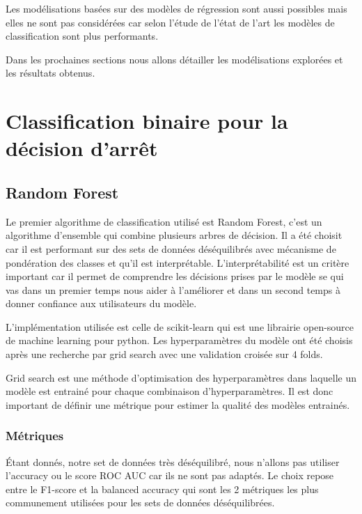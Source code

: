 Les modélisations basées sur des modèles de régression sont aussi possibles mais elles ne sont pas considérées car selon l'étude de l'état de l'art
\cite{app10217805} les modèles de classification sont plus performants.

Dans les prochaines sections nous allons détailler les modélisations explorées et les résultats obtenus.
\section{Classification binaire pour la décision d'arrêt}
\subsection{Random Forest}
Le premier algorithme de classification utilisé est Random Forest, c'est un algorithme d'ensemble qui combine plusieurs arbres de décision.
Il a été choisit car il est performant sur des sets de données déséquilibrés avec mécanisme de pondération des classes et qu'il est interprétable.
L'interprétabilité est un critère important car il permet de comprendre les décisions prises par le modèle se qui vas dans un premier temps nous aider à l'améliorer
et dans un second temps à donner confiance aux utilisateurs du modèle.

L'implémentation utilisée est celle de scikit-learn \cite{scikitLearnRandomForest} qui est une librairie open-source de machine learning pour python.
Les hyperparamètres du modèle ont été choisis après une recherche par grid search avec une validation croisée sur 4 folds.

Grid search est une méthode d'optimisation des hyperparamètres dans laquelle un modèle est entrainé pour chaque combinaison d'hyperparamètres.
Il est donc important de définir une métrique pour estimer la qualité des modèles entrainés.
\subsubsection{Métriques}
Étant donnés, notre set de données très déséquilibré, nous n'allons pas utiliser l'accuracy ou le score ROC AUC car ils ne sont pas adaptés.
Le choix repose entre le F1-score et la balanced accuracy qui sont les 2 métriques les plus communement utilisées pour les sets de données déséquilibrées.

